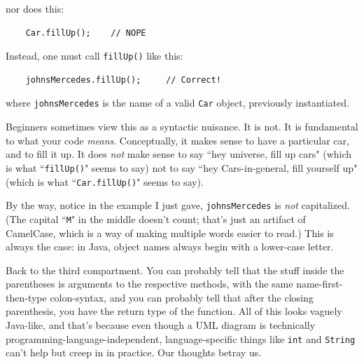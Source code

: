 nor does this:

\begin{verbatim}
    Car.fillUp();    // NOPE
\end{verbatim}

Instead, one must call \texttt{fillUp()} like this:

\begin{verbatim}
    johnsMercedes.fillUp();     // Correct!
\end{verbatim}

where \texttt{johnsMercedes} is the name of a valid \texttt{Car} object,
previously instantiated.

Beginners sometimes view this as a syntactic nuisance. It is not. It is
fundamental to what your code \textit{means}. Conceptually, it makes sense to
have a particular car, and to fill it up. It does \textit{not} make sense to
say ``hey universe, fill up cars" (which is what ``\texttt{fillUp()}" seems to
say) not to say ``hey Cars-in-general, fill yourself up" (which is what
``\texttt{Car.fillUp()}" seems to say).

By the way, notice in the example I just gave, \texttt{johnsMercedes} is
\textit{not} capitalized. (The capital ``\texttt{M}" in the middle doesn't
count; that's just an artifact of CamelCase, which is a way of making multiple
words easier to read.) This is always the case: in Java, object names always
begin with a lower-case letter.

Back to the third compartment. You can probably tell that the stuff inside the
parentheses is arguments to the respective methods, with the same
name-first-then-type colon-syntax, and you can probably tell that after the
closing parenthesis, you have the return type of the function. All of this
looks vaguely Java-like, and that's because even though a UML diagram is
technically programming-language-independent, language-specific things like
\texttt{int} and \texttt{String} can't help but creep in in practice. Our
thoughts betray us.

